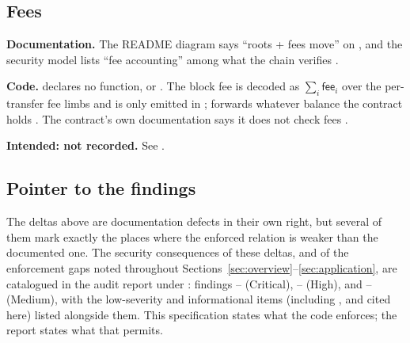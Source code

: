 \subsection{Fees}
\label{subsec:delta-fees}

\begin{specdelta}
\label{delta:fees}
\textbf{Documentation.} The README diagram says ``roots + fees move'' on
 , and the security model lists ``fee
accounting'' among what the chain verifies .

\textbf{Code.}  declares no  function,
 or  .
The block fee is decoded as $\sum_i \mathsf{fee}_i$ over the per-transfer fee
limbs  and is only emitted in
 ;
 forwards whatever balance the contract holds
. The contract's own documentation
says it does not check fees .

\textbf{Intended: not recorded.} See .
\end{specdelta}

\subsection{Pointer to the findings}

The deltas above are documentation defects in their own right, but several of
them mark exactly the places where the enforced relation is weaker than the
documented one. The security consequences of these deltas, and of the
enforcement gaps noted throughout Sections~\ref{sec:overview}--\ref{sec:application},
are catalogued in the audit report under : findings
-- (Critical), --
(High), and -- (Medium), with the low-severity and
informational items (including ,  and
 cited here) listed alongside them. This specification states
what the code enforces; the report states what that permits.
